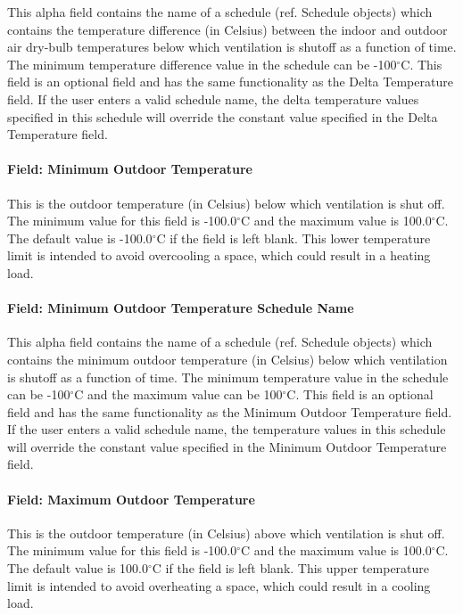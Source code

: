 This alpha field contains the name of a schedule (ref. Schedule objects) which contains the temperature difference (in Celsius) between the indoor and outdoor air dry-bulb temperatures below which ventilation is shutoff as a function of time. The minimum temperature difference value in the schedule can be -100$^\circ$C. This field is an optional field and has the same functionality as the Delta Temperature field. If the user enters a valid schedule name, the delta temperature values specified in this schedule will override the constant value specified in the Delta Temperature field.

\paragraph{Field: Minimum Outdoor Temperature}\label{field-minimum-outdoor-temperature}

This is the outdoor temperature (in Celsius) below which ventilation is shut off. The minimum value for this field is -100.0$^\circ$C and the maximum value is 100.0$^\circ$C. The default value is -100.0$^\circ$C if the field is left blank. This lower temperature limit is intended to avoid overcooling a space, which could result in a heating load.

\paragraph{Field: Minimum Outdoor Temperature Schedule Name}\label{field-minimum-outdoor-temperature-schedule-name}

This alpha field contains the name of a schedule (ref. Schedule objects) which contains the minimum outdoor temperature (in Celsius) below which ventilation is shutoff as a function of time. The minimum temperature value in the schedule can be -100$^\circ$C and the maximum value can be 100$^\circ$C. This field is an optional field and has the same functionality as the Minimum Outdoor Temperature field. If the user enters a valid schedule name, the temperature values in this schedule will override the constant value specified in the Minimum Outdoor Temperature field.

\paragraph{Field: Maximum Outdoor Temperature}\label{field-maximum-outdoor-temperature}

This is the outdoor temperature (in Celsius) above which ventilation is shut off. The minimum value for this field is -100.0$^\circ$C and the maximum value is 100.0$^\circ$C. The default value is 100.0$^\circ$C if the field is left blank. This upper temperature limit is intended to avoid overheating a space, which could result in a cooling load.

